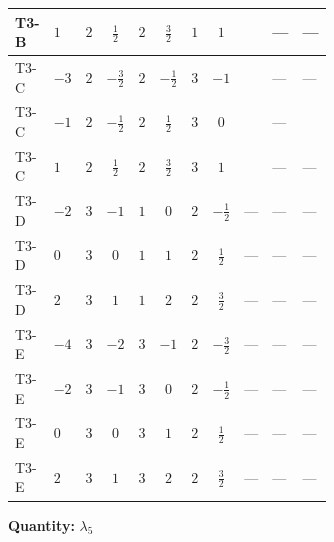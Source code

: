\documentclass[8pt]{article}
\begin{document}
\begin{landscape}
\begin{longtable}{@{}llcccccc >{\raggedright\arraybackslash}p{0.21\linewidth} >{\raggedright\arraybackslash}p{0.21\linewidth} >{\raggedright\arraybackslash}p{0.21\linewidth}@{}}
\midrule
T3-B & $1$ & $2$ & $\frac{1}{2}$ & $2$ & $\frac{3}{2}$ & $1$ & $1$ & \scriptsize\adjustbox{max width=\linewidth}{$\begin{gathered} -9 {g_1}^2 {\lambda_5}\end{gathered}$} & --- & --- \\
\midrule
T3-C & $-3$ & $2$ & $-\frac{3}{2}$ & $2$ & $-\frac{1}{2}$ & $3$ & $-1$ & \scriptsize\adjustbox{max width=\linewidth}{$\begin{gathered} -9 {g_1}^2 {\lambda_5}\end{gathered}$} & --- & --- \\
\midrule
T3-C & $-1$ & $2$ & $-\frac{1}{2}$ & $2$ & $\frac{1}{2}$ & $3$ & $0$ & \scriptsize\adjustbox{max width=\linewidth}{$\begin{gathered} -3 {g_1}^2 {\lambda_5}\end{gathered}$} & --- & \scriptsize\adjustbox{max width=\linewidth}{$\begin{gathered} +3 \left({\lambda_{8}}\right)^{*} \operatorname{Tr}\!\left({y_1}\,\left({y_2}\right)^{\dagger}\right)\end{gathered}$} \\
\midrule
T3-C & $1$ & $2$ & $\frac{1}{2}$ & $2$ & $\frac{3}{2}$ & $3$ & $1$ & \scriptsize\adjustbox{max width=\linewidth}{$\begin{gathered} -9 {g_1}^2 {\lambda_5}\end{gathered}$} & --- & --- \\
\midrule
T3-D & $-2$ & $3$ & $-1$ & $1$ & $0$ & $2$ & $-\frac{1}{2}$ & --- & --- & --- \\
\midrule
T3-D & $0$ & $3$ & $0$ & $1$ & $1$ & $2$ & $\frac{1}{2}$ & --- & --- & --- \\
\midrule
T3-D & $2$ & $3$ & $1$ & $1$ & $2$ & $2$ & $\frac{3}{2}$ & --- & --- & --- \\
\midrule
T3-E & $-4$ & $3$ & $-2$ & $3$ & $-1$ & $2$ & $-\frac{3}{2}$ & --- & --- & --- \\
\midrule
T3-E & $-2$ & $3$ & $-1$ & $3$ & $0$ & $2$ & $-\frac{1}{2}$ & --- & --- & --- \\
\midrule
T3-E & $0$ & $3$ & $0$ & $3$ & $1$ & $2$ & $\frac{1}{2}$ & --- & --- & --- \\
\midrule
T3-E & $2$ & $3$ & $1$ & $3$ & $2$ & $2$ & $\frac{3}{2}$ & --- & --- & --- \\
\midrule
\bottomrule
\end{longtable}
\clearpage
\noindent\textbf{Quantity: }$\lambda_5$\par\smallskip

\end{landscape}
\end{document}
